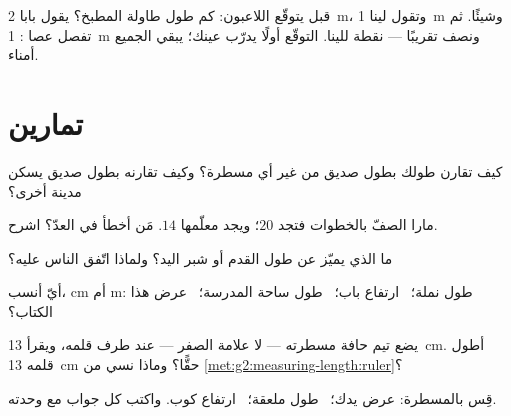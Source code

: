 \begin{example}[قدّر، ثم تحقّق]\label{ex:g2:measuring-length:estimate}
قبل  يتوقّع اللاعبون: كم طول طاولة المطبخ؟ يقول بابا
\qty{2}{m}، وتقول لينا \qty{1}{m} وشيئًا. ثم تفصل عصا :
\qty{1}{m} ونصف تقريبًا --- نقطة للينا. التوقّع أولًا يدرّب
عينك؛  يبقي الجميع أمناء.
\end{example}

\section{تمارين}

\begin{exercise}[$\star$]\label{exo:g2:measuring-length:1}
كيف تقارن طولك بطول صديق من غير أي مسطرة؟ وكيف تقارنه بطول صديق
يسكن مدينة أخرى؟
\end{exercise}

\begin{exercise}[$\star$]\label{exo:g2:measuring-length:2}
 مارا الصفّ بالخطوات فتجد $20$؛ ويجد معلّمها $14$. مَن أخطأ
في العدّ؟ اشرح.
\end{exercise}

\begin{exercise}[$\star$]\label{exo:g2:measuring-length:3}
ما الذي يميّز  عن طول القدم أو شبر اليد؟ ولماذا اتّفق
الناس عليه؟
\end{exercise}

\begin{exercise}[$\star$]\label{exo:g2:measuring-length:4}
أيّ  أنسب، \unit{cm} أم \unit{m}: طول نملة؛ \ ارتفاع باب؛
\ طول ساحة المدرسة؛ \ عرض هذا الكتاب؟
\end{exercise}

\begin{exercise}[$\star$]\label{exo:g2:measuring-length:5}
يضع تيم حافة مسطرته --- لا علامة الصفر --- عند طرف قلمه، ويقرأ
\qty{13}{cm}. أطول قلمه \qty{13}{cm} حقًّا؟ وماذا نسي من
\cref{met:g2:measuring-length:ruler}؟
\end{exercise}

\begin{exercise}[$\star$]\label{exo:g2:measuring-length:6}
قِس بالمسطرة: عرض يدك؛ \ طول ملعقة؛ \ ارتفاع كوب. واكتب كل
جواب مع وحدته.
\end{exercise}

